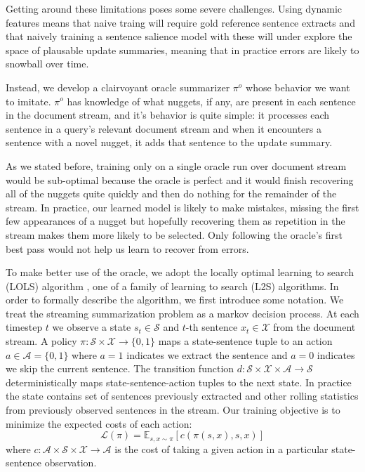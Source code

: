 Getting around these limitations poses some severe challenges. Using
dynamic features means that naive traing will require gold reference
sentence extracts and that naively training a sentence salience model
with these will under explore the space of plausable update summaries,
meaning that in practice errors are likely to snowball over time.

Instead, we develop a clairvoyant oracle summarizer $\pi^o$ whose behavior
we want to imitate. $\pi^o$ has knowledge of what nuggets, if any, 
are present in each sentence in the document stream, and it's behavior
is quite simple: it processes each sentence in a query's relevant document 
stream and 
when it encounters a sentence with a novel nugget, it adds that sentence
to the update summary.

As we stated before, training only on a single oracle run over document stream
would be sub-optimal because the oracle is perfect and it would finish 
recovering all of the nuggets quite quickly and then do nothing for
the remainder of the stream. In practice, our learned model is likely to
make mistakes, missing the first few appearances of a nugget but hopefully
recovering them as repetition in the stream makes them more likely to be 
selected. Only following the oracle's first best pass would not help us learn
to recover from errors.

To make better use of the oracle, we adopt the locally optimal learning to
search (LOLS) algorithm \cite{lols}, one of a family of learning to search 
(L2S) algorithms. In order to formally describe the algorithm, we first 
introduce some notation. We treat the streaming summarization problem
as a markov decision process. At each timestep $t$ we observe a state
$s_t \in \mathcal{S}$ and $t$-th sentence $x_t \in \mathcal{X}$ from the 
document stream.
A policy $\pi : \mathcal{S} \times \mathcal{X} \rightarrow \{0, 1\}$
maps a state-sentence tuple to an action $a \in \mathcal{A} =\{0,1\}$
where $a=1$ indicates we extract the sentence and $a=0$ indicates we skip
the current sentence. The transition function 
$d : \mathcal{S} \times \mathcal{X} \times \mathcal{A} \rightarrow \mathcal{S}$
deterministically maps state-sentence-action tuples to the next state. 
In practice the state contains set of sentences previously extracted and
other rolling statistics from previously observed sentences in the stream.
Our training objective is to minimize the expected costs of each action:
\[ \mathcal{L}(\pi) = \mathbb{E}_{s,x \sim \pi} \left[ c\left(\pi(s,x), s, x\right) \right] \]
where $c :\mathcal{A} \times \mathcal{S} \times \mathcal{X} \rightarrow \mathcal{A}$ is the cost of taking a given action in a particular state-sentence
observation.

